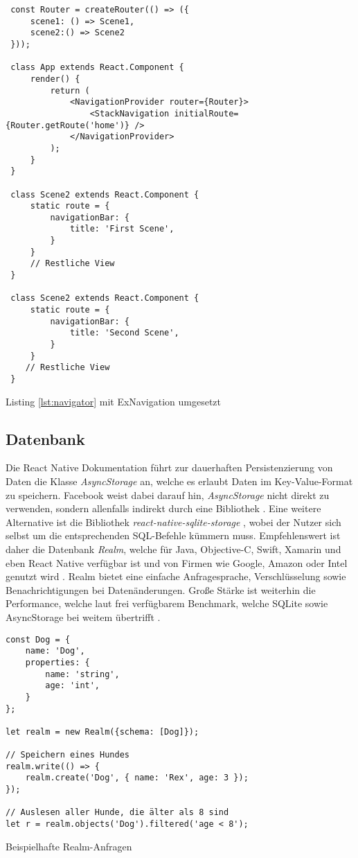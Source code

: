 \begin{listing}[H]
    \begin{verbatim}
 const Router = createRouter(() => ({
     scene1: () => Scene1,
     scene2:() => Scene2
 }));
 
 class App extends React.Component {
     render() {
         return (
             <NavigationProvider router={Router}>
                 <StackNavigation initialRoute={Router.getRoute('home')} />
             </NavigationProvider>
         );
     }
 }
 
 class Scene2 extends React.Component {
     static route = {
         navigationBar: {
             title: 'First Scene',
         }
     }
     // Restliche View
 }
 
 class Scene2 extends React.Component {
     static route = {
         navigationBar: {
             title: 'Second Scene',
         }
     }
    // Restliche View
 }
    \end{verbatim}
    \caption{Listing \ref{lst:navigator} mit ExNavigation umgesetzt}
    \label{lst:ex_navigation}
\end{listing}

\subsection{Datenbank}
Die React Native Dokumentation führt zur dauerhaften Persistenzierung von Daten die Klasse \textit{AsyncStorage} an, welche es erlaubt Daten im Key-Value-Format zu speichern. Facebook weist dabei darauf hin, \textit{AsyncStorage} nicht direkt zu verwenden, sondern allenfalls indirekt durch eine Bibliothek \cite{AsyncStorage_2017}. Eine weitere Alternative ist die Bibliothek \textit{react-native-sqlite-storage} \cite{react-native-sqlite-storage_2016}, wobei der Nutzer sich selbst um die entsprechenden SQL-Befehle kümmern muss. Empfehlenswert ist daher die Datenbank \textit{Realm}, welche für Java, Objective-C, Swift, Xamarin und eben React Native verfügbar ist und von Firmen wie Google, Amazon oder Intel genutzt wird \cite{Realm_2016}. Realm bietet eine einfache Anfragesprache, Verschlüsselung sowie Benachrichtigungen bei Datenänderungen. Große Stärke ist weiterhin die Performance, welche laut frei verfügbarem Benchmark, welche SQLite sowie AsyncStorage bei weitem übertrifft \cite{Introducing_Realm_React_Native_2016}. 

\begin{listing}[H]
    \begin{verbatim}
const Dog = {
    name: 'Dog',
    properties: {
        name: 'string',
        age: 'int',
    }
};

let realm = new Realm({schema: [Dog]});

// Speichern eines Hundes
realm.write(() => {
    realm.create('Dog', { name: 'Rex', age: 3 });
});

// Auslesen aller Hunde, die älter als 8 sind
let r = realm.objects('Dog').filtered('age < 8');
    \end{verbatim}
    \caption{Beispielhafte Realm-Anfragen}
    \label{lst:realm}
\end{listing}

